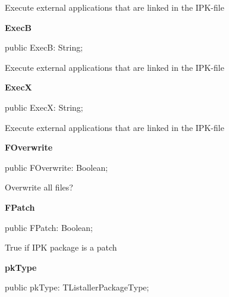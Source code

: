 \documentclass{report}
\newif\ifpdf
\begin{document}
\begin{list}{}
\begin{flushleft}
\ifpdf
\end{flushleft}
\fi


\par Execute external applications that are linked in the IPK{-}file\label{igobase.TIWizFrm-ExecB}
\item[\textbf{ExecB}\hfill]
\ifpdf
\begin{flushleft}
\fi
\begin{ttfamily}
public ExecB: String;\end{ttfamily}

\ifpdf
\end{flushleft}
\fi


\par Execute external applications that are linked in the IPK{-}file\label{igobase.TIWizFrm-ExecX}
\item[\textbf{ExecX}\hfill]
\ifpdf
\begin{flushleft}
\fi
\begin{ttfamily}
public ExecX: String;\end{ttfamily}

\ifpdf
\end{flushleft}
\fi


\par Execute external applications that are linked in the IPK{-}file\label{igobase.TIWizFrm-FOverwrite}
\item[\textbf{FOverwrite}\hfill]
\ifpdf
\begin{flushleft}
\fi
\begin{ttfamily}
public FOverwrite: Boolean;\end{ttfamily}

\ifpdf
\end{flushleft}
\fi


\par Overwrite all files?\label{igobase.TIWizFrm-FPatch}
\item[\textbf{FPatch}\hfill]
\ifpdf
\begin{flushleft}
\fi
\begin{ttfamily}
public FPatch: Boolean;\end{ttfamily}

\ifpdf
\end{flushleft}
\fi


\par True if IPK package is a patch\label{igobase.TIWizFrm-pkType}
\item[\textbf{pkType}\hfill]
\ifpdf
\begin{flushleft}
\fi
\begin{ttfamily}
public pkType: TListallerPackageType;\end{ttfamily}

\ifpdf
\end{flushleft}
\fi


\par  \end{list}
\end{document}
